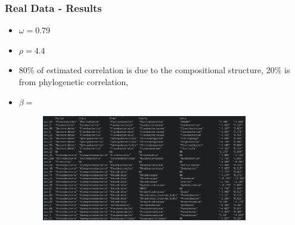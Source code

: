 \documentclass{beamer}
\begin{document}
\begin{frame}
\frametitle{Real Data - Results}
\begin{itemize}
  \item $\omega  = 0.79$
  \item $\rho = 4.4$
  \item 80\% of estimated correlation is due to the compositional structure, 20\% is from phylogenetic correlation,
  \item $\beta = $
%

\begin{figure}[!htb]
	\centering
	\includegraphics[width=0.85\textwidth]{img/2022_April_11_Research_Update-d6498332.png}

\end{figure}
\end{itemize}
\end{frame}
\end{document}
